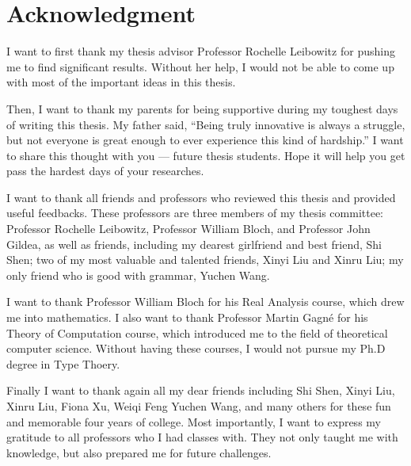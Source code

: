 \chapter{Acknowledgment}

I want to first thank my thesis advisor Professor
Rochelle Leibowitz for pushing me to find significant results.
Without her help,
I would not be able to come up with most of the important
ideas in this thesis.

Then, I want to thank my parents for being supportive
during my toughest days of writing this thesis.
My father said, ``Being truly innovative is always a struggle,
but not everyone is great enough
to ever experience this kind of hardship.''
I want to share this thought with you --- future thesis students.
Hope it will help you get pass
the hardest days of your researches.

I want to thank all friends and professors who
reviewed this thesis and provided useful feedbacks.
These professors are three members of my thesis committee:
Professor Rochelle Leibowitz,
Professor William Bloch,
and Professor John Gildea,
as well as friends, including
my dearest girlfriend and best friend, Shi Shen;
two of my most valuable and talented friends,
Xinyi Liu and Xinru Liu;
my only friend who is good with grammar, Yuchen Wang.

I want to thank Professor William Bloch
for his Real Analysis course,
which drew me into mathematics.
I also want to thank Professor Martin Gagné
for his Theory of Computation course,
which introduced me to the field of theoretical computer science.
Without having these courses,
I would not pursue my Ph.D degree in Type Thoery.

Finally I want to thank again all my dear friends
including Shi Shen, Xinyi Liu, Xinru Liu, Fiona Xu, Weiqi Feng
Yuchen Wang, and many others
for these fun and memorable four years of college.
Most importantly,
I want to express my gratitude to all professors
who I had classes with.
They not only taught me with knowledge,
but also prepared me for future challenges.
